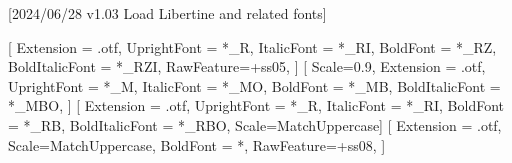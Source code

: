 
[2024/06/28 v1.03 Load Libertine and related fonts]

%
%
\ifpdftex
    \RequirePackage[T1]{fontenc}
    \RequirePackage{bm}%
\else
    \RequirePackage[warnings-off={mathtools-colon,mathtools-overbracket}]{unicode-math}
    \setmainfont{LinLibertine}[%
    	Extension = .otf,
    	UprightFont = *_R,
    	ItalicFont = *_RI,
    	BoldFont = *_RZ, %
    	BoldItalicFont = *_RZI, %
    	RawFeature={+ss05},%
        ]    
    \setmonofont{LinLibertine}[%
    	Scale=0.9,
	    Extension = .otf,
    	UprightFont = *_M,
    	ItalicFont = *_MO,%
    	BoldFont = *_MB,
	    BoldItalicFont = *_MBO,%
	]    
    \setsansfont{LinBiolinum}[%
    	Extension = .otf,
    	UprightFont = *_R,
    	ItalicFont = *_RI,
    	BoldFont = *_RB,
	    BoldItalicFont = *_RBO,%
    	Scale=MatchUppercase]
    [%
     	Extension = .otf,   
    	Scale=MatchUppercase,
		BoldFont = *,%
    	RawFeature={+ss08},%
    	]
    \newcommand*{\FRAC}[1]{{\addfontfeature{Fractions=On}#1}}%
\fi
